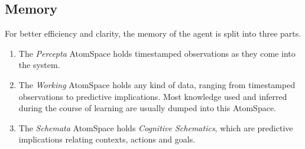 \documentclass[runningheads]{llncs}
\begin{document}


\subsection{Memory}
For better efficiency and clarity, the memory of the agent is split
into three parts.
\begin{enumerate}
\item The \emph{Percepta}
  AtomSpace holds timestamped
  observations as they come into the system.
\item The \emph{Working} AtomSpace holds any kind of data, ranging
  from timestamped observations to predictive implications.  Most
  knowledge used and inferred during the course of learning are
  usually dumped into this AtomSpace.
\item The \emph{Schemata} AtomSpace holds \emph{Cognitive Schematics},
  which are predictive implications relating contexts, actions and
  goals.%
\end{enumerate}
\end{document}
